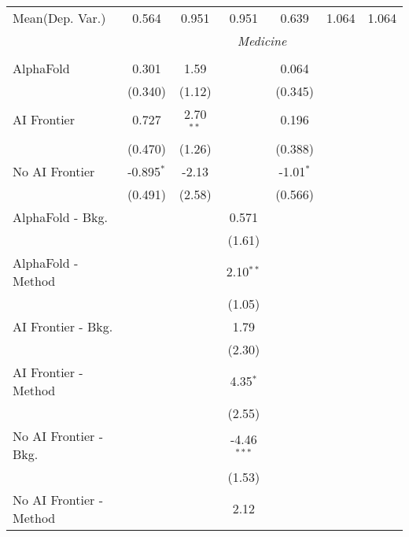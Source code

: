 \begin{tabular}{lcccccc}
Mean(Dep. Var.) & 0.564 & 0.951 & 0.951 & 0.639 & 1.064 & 1.064 \\
 & \multicolumn{6}{c}{\textit{Medicine}} \\ \\
   AlphaFold               & 0.301        & 1.59        &               & 0.064       &       &   \\   
                           & (0.340)      & (1.12)      &               & (0.345)     &       &   \\   
   AI Frontier             & 0.727        & 2.70$^{**}$ &               & 0.196       &       &   \\   
                           & (0.470)      & (1.26)      &               & (0.388)     &       &   \\   
   No AI Frontier          & -0.895$^{*}$ & -2.13       &               & -1.01$^{*}$ &       &   \\   
                           & (0.491)      & (2.58)      &               & (0.566)     &       &   \\   
   AlphaFold - Bkg.        &              &             & 0.571         &             &       &   \\   
                           &              &             & (1.61)        &             &       &   \\   
   AlphaFold - Method      &              &             & 2.10$^{**}$   &             &       &   \\   
                           &              &             & (1.05)        &             &       &   \\   
   AI Frontier - Bkg.      &              &             & 1.79          &             &       &   \\   
                           &              &             & (2.30)        &             &       &   \\   
   AI Frontier - Method    &              &             & 4.35$^{*}$    &             &       &   \\   
                           &              &             & (2.55)        &             &       &   \\   
   No AI Frontier - Bkg.   &              &             & -4.46$^{***}$ &             &       &   \\   
                           &              &             & (1.53)        &             &       &   \\   
   No AI Frontier - Method &              &             & 2.12          &             &       &   \\   

\end{tabular}
